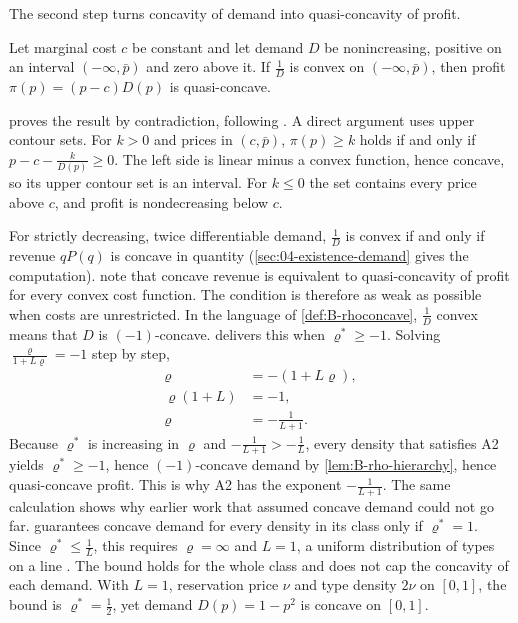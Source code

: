 The second step turns concavity of demand into quasi-concavity of profit.

\begin{proposition}\label{prop:B-cn-quasiconcave}
Let marginal cost $c$ be constant and let demand $D$ be nonincreasing, positive on an interval $(-\infty, \bar p)$
and zero above it. If $\frac{1}{D}$ is convex on $(-\infty, \bar p)$, then profit $\pi(p) = (p - c)D(p)$ is
quasi-concave.
\end{proposition}

 proves the result by contradiction, following \citet[p.~29]{CaplinNalebuff1991}. A direct
argument uses upper contour sets. For $k > 0$ and prices in $(c, \bar p)$, $\pi(p) \geq k$ holds if and only if
$p - c - \frac{k}{D(p)} \geq 0$. The left side is linear minus a convex function, hence concave, so its upper
contour set is an interval. For $k \leq 0$ the set contains every price above $c$, and profit is nondecreasing
below $c$.

For strictly decreasing, twice differentiable demand, $\frac{1}{D}$ is convex if and only if revenue $qP(q)$ is
concave in quantity (\cref{sec:04-existence-demand} gives the computation). \citet[Section 5]{CaplinNalebuff1991}
note that concave revenue is equivalent to quasi-concavity of profit for every convex cost function. The condition is therefore as weak as possible when costs are unrestricted. In the language of
\cref{def:B-rhoconcave}, $\frac{1}{D}$ convex means that $D$ is $(-1)$-concave. 
delivers this when $\varrho^* \geq -1$. Solving $\frac{\varrho}{1 + L\varrho} = -1$ step by step,
\begin{align*}
  \varrho &= -(1 + L\varrho),\\
  \varrho(1 + L) &= -1,\\
  \varrho &= -\frac{1}{L + 1}.
\end{align*}
Because $\varrho^*$ is increasing in $\varrho$ and $-\frac{1}{L + 1} > -\frac{1}{L}$, every density that satisfies A2 yields
$\varrho^* \geq -1$, hence $(-1)$-concave demand by \cref{lem:B-rho-hierarchy}, hence quasi-concave profit. This
is why A2 has the exponent $-\frac{1}{L + 1}$. The same calculation shows why earlier work that assumed concave
demand could not go far.  guarantees concave demand for every density in its class only
if $\varrho^* = 1$. Since $\varrho^* \leq \frac{1}{L}$, this requires $\varrho = \infty$ and $L = 1$, a uniform distribution of
types on a line \citep[p.~14]{CaplinNalebuff1991}. The bound holds for the whole class and does not cap the concavity
of each demand. With $L = 1$, reservation price $\nu$ and type density $2\nu$ on $[0, 1]$, the bound is
$\varrho^* = \frac{1}{2}$, yet demand $D(p) = 1 - p^2$ is concave on $[0, 1]$.

